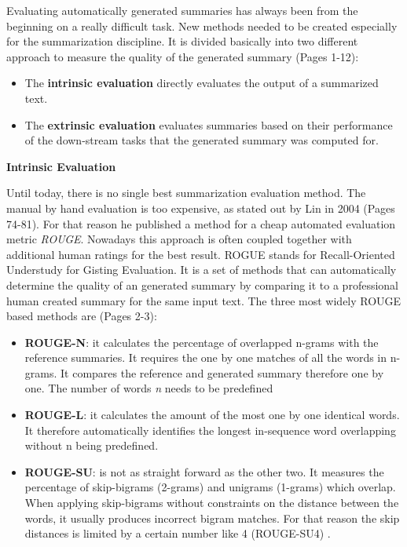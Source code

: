 Evaluating automatically generated summaries has always been from the beginning on a really difficult task. New methods needed to be created especially for the summarization discipline. It is divided basically into two different approach to measure the quality of the generated summary \cite{Jones98automaticsummarising:} (Pages 1-12):

\begin{itemize}
	\item The \textbf{intrinsic evaluation} directly evaluates the output of a summarized text. 
	\item The \textbf{extrinsic evaluation} evaluates summaries based on their performance of the down-stream tasks that the generated summary was computed for.
\end{itemize}

\textbf{Intrinsic Evaluation}

Until today, there is no single best summarization evaluation method. The manual by hand evaluation is too expensive, as stated out by Lin in 2004 \cite{lin-2004-rouge} (Pages 74-81). For that reason he published a method for a cheap automated evaluation metric \textit{ROUGE}. Nowadays this approach is often coupled together with additional human ratings for the best result. ROGUE stands for Recall-Oriented Understudy for Gisting Evaluation. It is a set of methods that can automatically determine the quality of an generated summary by comparing it to a professional human created summary for the same input text. The three most widely ROUGE based methods are \cite{yue} (Pages 2-3):

\begin{itemize}
	\item \textbf{ROUGE-N}: it calculates the percentage of overlapped n-grams with the reference summaries. It requires the one by one matches of all the words in n-grams. It compares the reference and generated summary therefore one by one. The number of words \textit{n} needs to be predefined
	\item \textbf{ROUGE-L}: it calculates the amount of the most one by one identical words. It therefore automatically identifies the longest in-sequence word overlapping without n being predefined.
	\item \textbf{ROUGE-SU}: is not as straight forward as the other two. It measures the percentage of skip-bigrams (2-grams) and unigrams (1-grams) which overlap. When applying skip-bigrams without constraints on the distance between the words, it usually produces incorrect bigram matches. For that reason the skip distances is limited by a certain number like 4 (ROUGE-SU4) \cite{lin-2004-rouge}.
\end{itemize}

